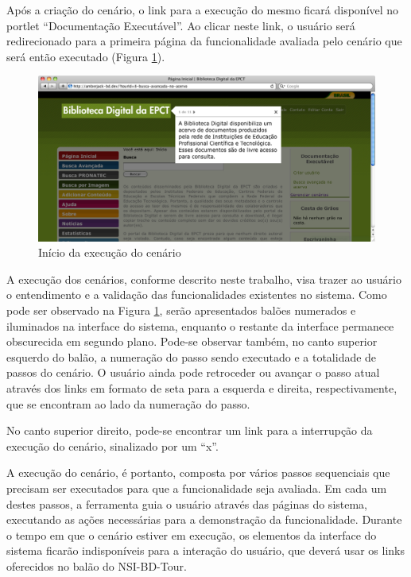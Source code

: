 Após a criação do cenário, o link para a execução do mesmo ficará disponível no portlet “Documentação Executável”. Ao clicar neste link, o usuário será redirecionado para a primeira página da funcionalidade avaliada pelo cenário que será então executado (Figura \ref{tour_4}).

\begin{figure}[ht]
    \centering
    \includegraphics[width=0.9 \textwidth]{figuras/tour_4}
    \caption{Início da execução do cenário}
    \label{tour_4}
\end{figure}

A execução dos cenários, conforme descrito neste trabalho, visa trazer ao usuário o entendimento e a validação das funcionalidades existentes no sistema. Como pode ser observado na Figura \ref{tour_4}, serão apresentados balões numerados e iluminados na interface do sistema, enquanto o restante da interface permanece obscurecida em segundo plano. Pode-se observar também, no canto superior esquerdo do balão, a numeração do passo sendo executado e a totalidade de passos do cenário. O usuário ainda pode retroceder ou avançar o passo atual através dos links em formato de seta para a esquerda e direita, respectivamente, que se encontram ao lado da numeração do passo.

No canto superior direito, pode-se encontrar um link para a interrupção da execução do cenário, sinalizado por um “x”.

A execução do cenário, é portanto, composta por vários passos sequenciais que precisam ser executados para que a funcionalidade seja avaliada. Em cada um destes passos, a ferramenta guia o usuário através das páginas do sistema, executando as ações necessárias para a demonstração da funcionalidade. Durante o tempo em que o cenário estiver em execução, os elementos da interface do sistema ficarão indisponíveis para a interação do usuário, que deverá usar os links oferecidos no balão do NSI-BD-Tour.


